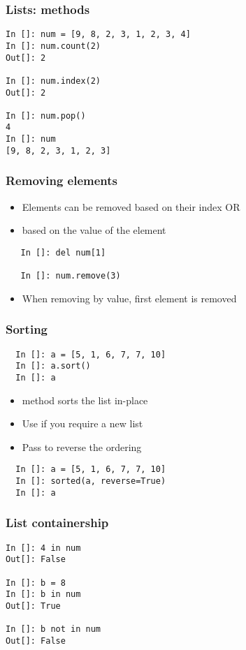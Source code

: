 \documentclass[14pt,compress]{beamer}
\begin{document}
\begin{frame}[fragile]
  \frametitle{Lists: methods}
  \begin{lstlisting}
In []: num = [9, 8, 2, 3, 1, 2, 3, 4]
In []: num.count(2)
Out[]: 2

In []: num.index(2)
Out[]: 2

In []: num.pop()
4
In []: num
[9, 8, 2, 3, 1, 2, 3]
  \end{lstlisting}
\end{frame}

\begin{frame}[fragile]
  \frametitle{Removing elements}
\begin{itemize}
  \item Elements can be removed based on their index OR
  \item based on the value of the element
  \end{itemize}
  \begin{lstlisting}
   In []: del num[1]

   In []: num.remove(3)
  \end{lstlisting}
  \begin{itemize}
  \item \alert{When removing by value, first element is removed}
  \end{itemize}
\end{frame}

\begin{frame}[fragile]
  \frametitle{Sorting}
  \begin{lstlisting}
  In []: a = [5, 1, 6, 7, 7, 10]
  In []: a.sort()
  In []: a
  \end{lstlisting}
  \begin{itemize}
  \item {} method sorts the list in-place
  \item Use  if you require a new list
  \item Pass  to reverse the ordering
  \end{itemize}
  \begin{lstlisting}
  In []: a = [5, 1, 6, 7, 7, 10]
  In []: sorted(a, reverse=True)
  In []: a
  \end{lstlisting}
\end{frame}

\begin{frame}[fragile]
\frametitle{List containership}
\begin{lstlisting}
In []: 4 in num
Out[]: False

In []: b = 8
In []: b in num
Out[]: True

In []: b not in num
Out[]: False
\end{lstlisting}
\end{frame}
\end{document}
